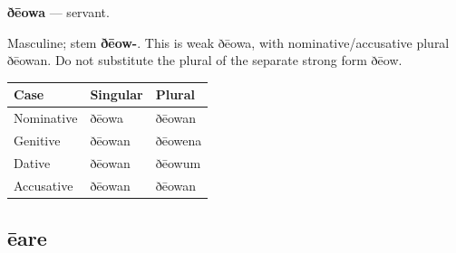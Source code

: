 \par\begin{minipage}{\linewidth}\raggedright
\textbf{ðēowa} — servant.

Masculine; stem \textbf{ðēow-}. This is weak ðēowa, with nominative/\allowbreak{}accusative plural ðēowan. Do not substitute the plural of the separate strong form ðēow.

\par\begingroup
\fontsize{10.5}{13.2}\selectfont
\setlength{\LTleft}{0pt}\setlength{\LTright}{\fill}
\noindent
\begin{tabular}{@{}>{\raggedright\arraybackslash}p{39.46mm}>{\raggedright\arraybackslash}p{39.46mm}>{\raggedright\arraybackslash}p{39.46mm}@{}}
\toprule
\textbf{Case} & \textbf{Singular} & \textbf{Plural} \\
\midrule
Nominative & ðēowa & ðēowan \\
Genitive & ðēowan & ðēowena \\
Dative & ðēowan & ðēowum \\
Accusative & ðēowan & ðēowan \\
\bottomrule
\end{tabular}
\par\endgroup

\end{minipage}\par
{}
\subsection*{ēare}

